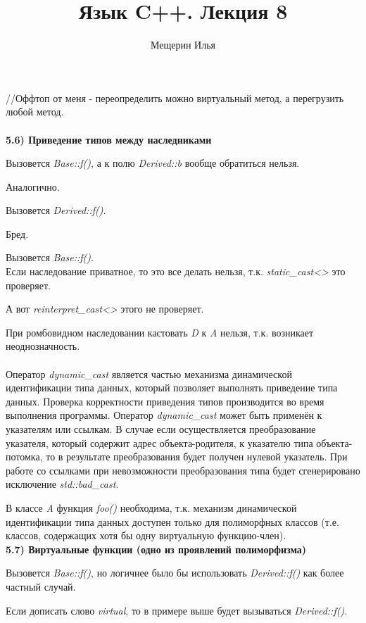 \documentclass{article}
\title{Язык C++. Лекция 8}
\author{Мещерин Илья}
\date{\DTMdate{2018-11-03}}
\begin{document}
\maketitle

\newcommand{\cs}[1]{}
\newcommand{\cb}[1]{}

\noindent//Оффтоп от меня - переопределить можно виртуальный метод, а перегрузить любой метод.\\\\
\noindent \textbf{5.6) Приведение типов между наследниками}
\cb{1-17}
Вызовется \textit{Base::f()}, а к полю \textit{Derived::b} вообще обратиться нельзя.
\cs{19-21}
Аналогично.
\cs{23-24}
Вызовется \textit{Derived::f()}.
\cs{26-29}
Бред.
\cs{31-31}
Вызовется \textit{Base::f()}.\\
Если наследование приватное, то это все делать нельзя, т.к. \textit{static\_cast<>} это проверяет.
\cs{33-33}
А вот \textit{reinterpret\_cast<>} этого не проверяет.
\cb{35-50}
При ромбовидном наследовании кастовать \textit{D} к \textit{A} нельзя, т.к. возникает неоднозначность.\\\\
Оператор \textit{dynamic\_cast} является частью механизма динамической идентификации типа данных, который позволяет выполнять приведение типа данных. Проверка корректности приведения типов производится во время выполнения программы. Оператор \textit{dynamic\_cast} может быть применён к указателям или ссылкам. В случае если осуществляется преобразование указателя, который содержит адрес объекта-родителя, к указателю типа объекта-потомка, то в результате преобразования будет получен нулевой указатель. При работе со ссылками при невозможности преобразования типа будет сгенерировано исключение \textit{std::bad\_cast}.
\cb{52-85}
В классе \textit{A} функция \textit{foo()} необходима, т.к. механизм динамической идентификации типа данных доступен только для полиморфных классов (т.е. классов, содержащих хотя бы одну виртуальную функцию-член).\\
\noindent \textbf{5.7) Виртуальные функции (одно из проявлений полиморфизма)}
\cb{87-101}
Вызовется \textit{Base::f()}, но логичнее было бы использовать \textit{Derived::f()} как более частный случай.
\cs{103-106}
Если дописать слово \textit{virtual}, то в примере выше будет вызываться \textit{Derived::f()}.\\
\end{document}
